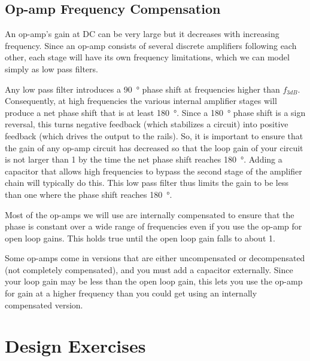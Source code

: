 \documentclass{article}
\begin{document}
\subsection{Op-amp Frequency Compensation}
An op-amp's gain at DC can be very large but it decreases with increasing frequency. Since an op-amp consists of several discrete amplifiers following each other, each stage will have its own frequency limitations, which we can model simply as low pass filters.

Any low pass filter introduces a \SI{90}{\degree} phase shift at frequencies higher than $f_{3dB}$. Consequently, at high frequencies the various internal amplifier stages will produce a net phase shift that is at least \SI{180}{\degree}. Since a \SI{180}{\degree} phase shift is a sign reversal, this turns negative feedback (which stabilizes a circuit) into positive feedback (which drives the output to the rails). So, it is important to ensure that the gain of any op-amp circuit has decreased so that the loop gain of your circuit is not larger than 1 by the time the net phase shift reaches \SI{180}{\degree}. Adding a capacitor that allows high frequencies to bypass the second stage of the amplifier chain will typically do this. This low pass filter thus limits the gain to be less than one where the phase shift reaches \SI{180}{\degree}. 

Most of the op-amps we will use are internally compensated to ensure that the phase is constant over a wide range of frequencies even if you use the op-amp for open loop gains. This holds true until the open loop gain falls to about 1.

Some op-amps come in versions that are either uncompensated or decompensated (not completely compensated), and you must add a capacitor externally. Since your loop gain may be less than the open loop gain, this lets you use the op-amp for gain at a higher frequency than you could get using an internally compensated version.


\pagebreak

\section{Design Exercises}
\end{document}
